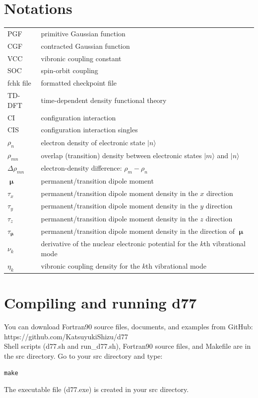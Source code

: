 ﻿\documentclass[11pt,a4paper,openany]{article}
\begin{document}
\section{Notations}
\noindent
\begin{tabular}{ll}
PGF & primitive Gaussian function\\
CGF & contracted Gaussian function\\
VCC & vibronic coupling constant\\
SOC & spin-orbit coupling\\
fchk file & formatted checkpoint file\\
TD-DFT & time-dependent density functional theory\\
CI & configuration interaction\\
CIS & configuration interaction singles\\
$\rho_{n}$ & electron density of electronic state $| n \rangle$\\
$\rho_{mn}$ & overlap (transition) density between electronic states $| m \rangle$ and $| n \rangle$\\
$\Delta\rho_{mn}$ & electron-density difference: $\rho_{m}-\rho_{n}$\\
$\bm{\upmu}$ & permanent/transition dipole moment \\
$\tau_x$ & permanent/transition dipole moment density in the $x$ direction\\
$\tau_y$ & permanent/transition dipole moment density in the $y$ direction\\
$\tau_z$ & permanent/transition dipole moment density in the $z$ direction\\
$\tau_{\bm{\upmu}}$ & permanent/transition dipole moment density in the direction of $\bm{\upmu}$\\
$\nu_k$ & derivative of the nuclear electronic potential for the $k$th vibrational mode\\
$\eta_k$ & vibronic coupling density for the $k$th vibrational mode
\end{tabular}
\clearpage
\section{Compiling and running  d77}
\noindent
You can download Fortran90 source files, documents, and examples from 
GitHub:\cite{d77}\\
https://github.com/KatsuyukiShizu/d77\\
Shell scripts (d77.sh and run\_d77.sh), Fortran90 source files, and Makefile are in the src directory.
Go to your src directory and type:
\begin{verbatim}
make
\end{verbatim}
The executable file (d77.exe) is created in your src directory.\\
\end{document}
